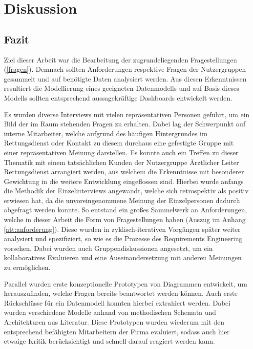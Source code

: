 \chapter{Diskussion}
\label{fazit}
\minitoc\pagebreak

\section{Fazit}
Ziel dieser Arbeit war die Bearbeitung der zugrundeliegenden Fragestellungen (\ref{fragen}).
Demnach sollten Anforderungen respektive Fragen der Nutzergruppen gesammelt und auf benötigte Daten analysiert werden.
Aus diesen Erkenntnissen resultiert die Modellierung eines geeigneten Datenmodells und auf Basis dieses Modells sollten entsprechend aussagekräftige Dashboards entwickelt werden.

Es wurden diverse Interviews mit vielen repräsentativen Personen geführt, um ein Bild der im Raum stehenden Fragen zu erhalten.
Dabei lag der Schwerpunkt auf interne Mitarbeiter, welche aufgrund des häufigen Hintergrundes im Rettungsdienst oder Kontakt zu diesem durchaus eine gefestigte Gruppe mit einer repräsentativen Meinung darstellen.
Es konnte auch ein Treffen zu dieser Thematik mit einem tatsächlichen Kunden der Nutzergruppe \glqq Ärztlicher Leiter Rettungsdienst\grqq{} arrangiert werden, aus welchem die Erkenntnisse mit besonderer Gewichtung in die weitere Entwicklung eingeflossen sind.
Hierbei wurde anfangs die Methodik der Einzelinterviews angewandt, welche sich retrospektiv als positiv erwiesen hat, da die unvoreingenommene Meinung der Einzelpersonen dadurch abgefragt werden konnte.
So entstand ein großes Sammelwerk an Anforderungen, welche in dieser Arbeit die Form von Fragestellungen haben (Auszug im Anhang \ref{att:anforderung}).
Diese wurden in zyklisch-iterativen Vorgängen später weiter analysiert und spezifiziert, so wie es die Prozesse des Requirements Engineering vorsehen. 
Dabei wurden auch Gruppendiskussionen angesetzt, um ein kollaboratives Evaluieren und eine Auseinandersetzung mit anderen Meinungen zu ermöglichen.

Parallel wurden erste konzeptionelle Prototypen von Diagrammen entwickelt, um herauszufinden, welche Fragen bereits beantwortet werden können.
Auch erste Rückschlüsse für ein Datenmodell konnten hierbei extrahiert werden.
Dabei wurden verschiedene Modelle anhand von methodischen Schemata und Architekturen aus Literatur.
Diese Prototypen wurden wiederum mit den entsprechend befähigten Mitarbeitern der Firma evaluiert, sodass auch hier etwaige Kritik berücksichtigt und schnell darauf reagiert werden kann.

